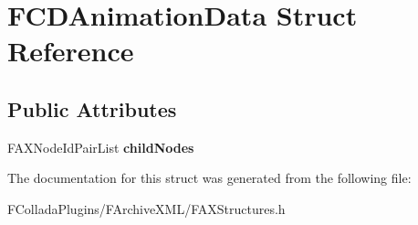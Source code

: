 \hypertarget{structFCDAnimationData}{
\section{FCDAnimationData Struct Reference}
\label{structFCDAnimationData}
}
\subsection*{Public Attributes}
\begin{DoxyCompactItemize}
\item 
\hypertarget{structFCDAnimationData_a2161163930f76b5f439f0192088616a8}{
FAXNodeIdPairList {\bfseries childNodes}}
\label{structFCDAnimationData_a2161163930f76b5f439f0192088616a8}

\end{DoxyCompactItemize}


The documentation for this struct was generated from the following file:\begin{DoxyCompactItemize}
\item 
FColladaPlugins/FArchiveXML/FAXStructures.h\end{DoxyCompactItemize}
